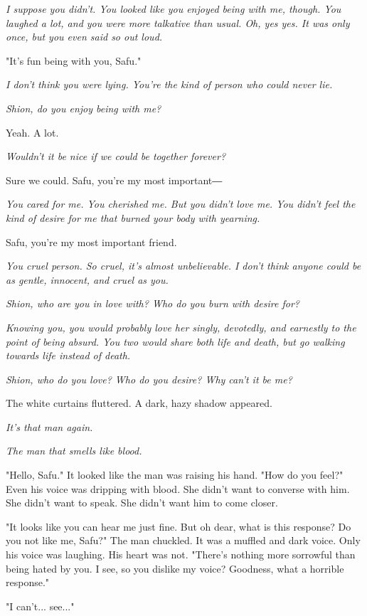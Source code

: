 \emph{I suppose you didn't. You looked like you enjoyed being with me, though.
You laughed a lot, and you were more talkative than usual. Oh, yes yes.
It was only once, but you even said so out loud.}

"It's fun being with you, Safu."

\emph{I don't think you were lying. You're the kind of person who could never
lie.}

\emph{Shion, do you enjoy being with me?}

Yeah. A lot.

\emph{Wouldn't it be nice if we could be together forever?}

Sure we could. Safu, you're my most important―

\emph{You cared for me. You cherished me. But you didn't love me. You didn't
feel the kind of desire for me that burned your body with yearning.}

Safu, you're my most important friend.

\emph{You cruel person. So cruel, it's almost unbelievable. I don't think
anyone could be as gentle, innocent, and cruel as you.}

\emph{Shion, who are you in love with? Who do you burn with desire for?}

\emph{Knowing you, you would probably love her singly, devotedly, and
earnestly to the point of being absurd. You two would share both life
and death, but go walking towards life instead of death.}

\emph{Shion, who do you love? Who do you desire? Why can't it be me?}

The white curtains fluttered. A dark, hazy shadow appeared.

\emph{It's that man again.}

\emph{The man that smells like blood.}

"Hello, Safu." It looked like the man was raising his hand. "How do you
feel?" Even his voice was dripping with blood. She didn't want to
converse with him. She didn't want to speak. She didn't want him to come
closer.

"It looks like you can hear me just fine. But oh dear, what is this
response? Do you not like me, Safu?" The man chuckled. It was a muffled
and dark voice. Only his voice was laughing. His heart was not. "There's
nothing more sorrowful than being hated by you. I see, so you dislike my
voice? Goodness, what a horrible response."

"I can't... see..."

